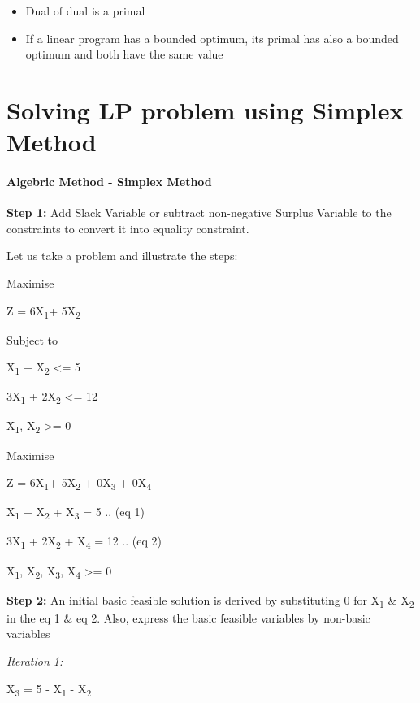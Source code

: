 \documentclass[]{article}
\providecommand{\tightlist}{%
  \setlength{\itemsep}{0pt}\setlength{\parskip}{0pt}}
\let\oldparagraph\paragraph
\renewcommand{\paragraph}[1]{\oldparagraph{#1}\mbox{}}
\begin{document}
\begin{itemize}
\tightlist
\item
  Dual of dual is a primal
\item
  If a linear program has a bounded optimum, its primal has also a
  bounded optimum and both have the same value
\end{itemize}

\section{Solving LP problem using Simplex
Method}\label{solving-lp-problem-using-simplex-method}

\paragraph{Algebric Method - Simplex
Method}\label{algebric-method---simplex-method}

\textbf{Step 1:} Add Slack Variable or subtract non-negative Surplus
Variable to the constraints to convert it into equality constraint.

Let us take a problem and illustrate the steps:

Maximise

Z = 6X\textsubscript{1}+ 5X\textsubscript{2}

Subject to

X\textsubscript{1} + X\textsubscript{2} \textless{}= 5

3X\textsubscript{1} + 2X\textsubscript{2} \textless{}= 12

X\textsubscript{1}, X\textsubscript{2} \textgreater{}= 0

Maximise

Z = 6X\textsubscript{1}+ 5X\textsubscript{2} + 0X\textsubscript{3} +
0X\textsubscript{4}

X\textsubscript{1} + X\textsubscript{2} + X\textsubscript{3} = 5 .. (eq
1)

3X\textsubscript{1} + 2X\textsubscript{2} + X\textsubscript{4} = 12 ..
(eq 2)

X\textsubscript{1}, X\textsubscript{2}, X\textsubscript{3},
X\textsubscript{4} \textgreater{}= 0

\textbf{Step 2:} An initial basic feasible solution is derived by
substituting 0 for X\textsubscript{1} \& X\textsubscript{2} in the eq 1
\& eq 2. Also, express the basic feasible variables by non-basic
variables

\emph{Iteration 1:}

X\textsubscript{3} = 5 - X\textsubscript{1} - X\textsubscript{2}
\end{document}
